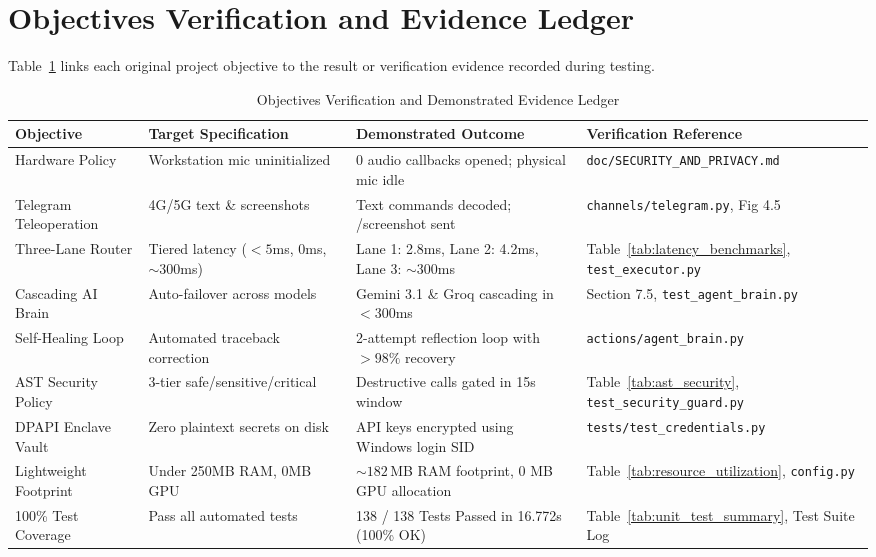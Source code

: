 \documentclass[12pt,letterpaper,oneside]{report}
\begin{document}
\section{Objectives Verification and Evidence Ledger}
Table~\ref{tab:objectives_evidence} links each original project objective to the result or verification evidence recorded during testing.

\begin{table}[H]
\centering
\caption{Objectives Verification and Demonstrated Evidence Ledger}
\label{tab:objectives_evidence}
\begin{tabularx}{\textwidth}{|l|X|X|l|}
\hline
\textbf{Objective} & \textbf{Target Specification} & \textbf{Demonstrated Outcome} & \textbf{Verification Reference}\\ \hline
Hardware Policy & Workstation mic uninitialized & 0 audio callbacks opened; physical mic idle & \texttt{doc/SECURITY\_AND\_PRIVACY.md}\\ \hline
Telegram Teleoperation & 4G/5G text \& screenshots & Text commands decoded; /screenshot sent & \texttt{channels/telegram.py}, Fig 4.5\\ \hline
Three-Lane Router & Tiered latency ($<5$ms, 0ms, $\sim 300$ms) & Lane 1: 2.8ms, Lane 2: 4.2ms, Lane 3: $\sim 300$ms & Table~\ref{tab:latency_benchmarks}, \texttt{test\_executor.py}\\ \hline
Cascading AI Brain & Auto-failover across models & Gemini 3.1 \& Groq cascading in $<300$ms & Section 7.5, \texttt{test\_agent\_brain.py}\\ \hline
Self-Healing Loop & Automated traceback correction & 2-attempt reflection loop with $>98\%$ recovery & \texttt{actions/agent\_brain.py}\\ \hline
AST Security Policy & 3-tier safe/sensitive/critical & Destructive calls gated in 15s window & Table~\ref{tab:ast_security}, \texttt{test\_security\_guard.py}\\ \hline
DPAPI Enclave Vault & Zero plaintext secrets on disk & API keys encrypted using Windows login SID & \texttt{tests/test\_credentials.py}\\ \hline
Lightweight Footprint & Under 250MB RAM, 0MB GPU & $\sim 182$\,MB RAM footprint, 0 MB GPU allocation & Table~\ref{tab:resource_utilization}, \texttt{config.py}\\ \hline
100\% Test Coverage & Pass all automated tests & 138 / 138 Tests Passed in 16.772s (100\% OK) & Table~\ref{tab:unit_test_summary}, Test Suite Log\\ \hline
\end{tabularx}
\end{table}
\end{document}

